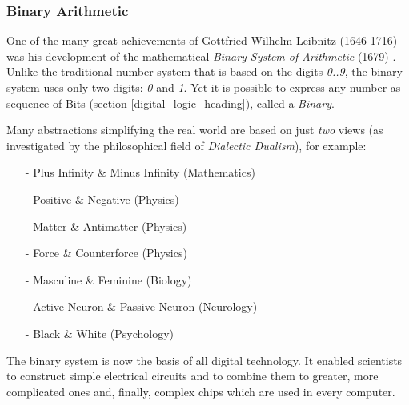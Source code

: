 %
%
%
%
%
%
%

\subsubsection{Binary Arithmetic}
\label{binary_arithmetic_heading}

One of the many great achievements of Gottfried Wilhelm Leibnitz (1646-1716)
\cite{standrews} was his development of the mathematical
\emph{Binary System of Arithmetic} (1679) \cite{friesian}. Unlike the
traditional number system that is based on the digits \emph{0..9}, the binary
system uses only two digits: \emph{0} and \emph{1}. Yet it is possible to
express any number as sequence of Bits (section \ref{digital_logic_heading}),
called a \emph{Binary}.

Many abstractions simplifying the real world are based on just \emph{two} views
(as investigated by the philosophical field of \emph{Dialectic Dualism}), for
example:

\begin{itemize}
    \item[-] Plus Infinity \& Minus Infinity (Mathematics)
    \item[-] Positive \& Negative (Physics)
    \item[-] Matter \& Antimatter (Physics)
    \item[-] Force \& Counterforce (Physics)
    \item[-] Masculine \& Feminine (Biology)
    \item[-] Active Neuron \& Passive Neuron (Neurology)
    \item[-] Black \& White (Psychology)
\end{itemize}

The binary system is now the basis of all digital technology. It enabled
scientists to construct simple electrical circuits and to combine them to
greater, more complicated ones and, finally, complex chips which are used in
every computer.
